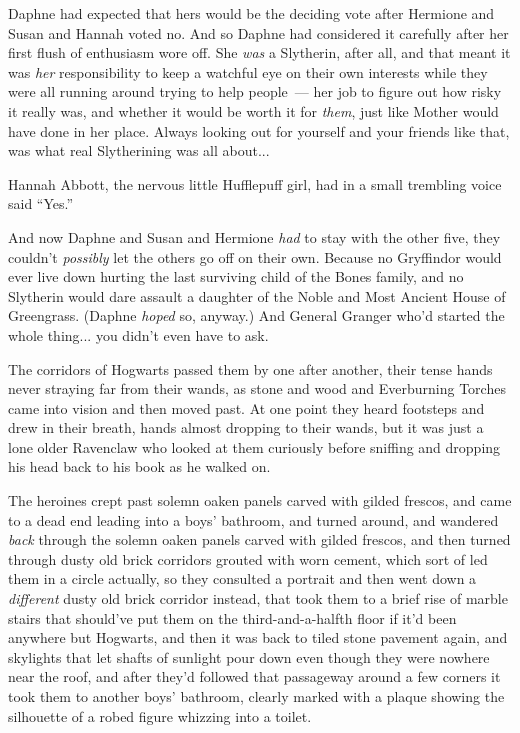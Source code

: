 Daphne had expected that hers would be the deciding vote after Hermione and Susan and Hannah voted no. And so Daphne had considered it carefully after her first flush of enthusiasm wore off. She \emph{was} a Slytherin, after all, and that meant it was \emph{her} responsibility to keep a watchful eye on their own interests while they were all running around trying to help people~--- her job to figure out how risky it really was, and whether it would be worth it for \emph{them}, just like Mother would have done in her place. Always looking out for yourself and your friends like that, was what real Slytherining was all about...

Hannah Abbott, the nervous little Hufflepuff girl, had in a small trembling voice said ``Yes.''

And now Daphne and Susan and Hermione \emph{had} to stay with the other five, they couldn't \emph{possibly} let the others go off on their own. Because no Gryffindor would ever live down hurting the last surviving child of the Bones family, and no Slytherin would dare assault a daughter of the Noble and Most Ancient House of Greengrass. (Daphne \emph{hoped} so, anyway.) And General Granger who'd started the whole thing... you didn't even have to ask.

The corridors of Hogwarts passed them by one after another, their tense hands never straying far from their wands, as stone and wood and Everburning Torches came into vision and then moved past. At one point they heard footsteps and drew in their breath, hands almost dropping to their wands, but it was just a lone older Ravenclaw who looked at them curiously before sniffing and dropping his head back to his book as he walked on.

The heroines crept past solemn oaken panels carved with gilded frescos, and came to a dead end leading into a boys' bathroom, and turned around, and wandered \emph{back} through the solemn oaken panels carved with gilded frescos, and then turned through dusty old brick corridors grouted with worn cement, which sort of led them in a circle actually, so they consulted a portrait and then went down a \emph{different} dusty old brick corridor instead, that took them to a brief rise of marble stairs that should've put them on the third-and-a-halfth floor if it'd been anywhere but Hogwarts, and then it was back to tiled stone pavement again, and skylights that let shafts of sunlight pour down even though they were nowhere near the roof, and after they'd followed that passageway around a few corners it took them to another boys' bathroom, clearly marked with a plaque showing the silhouette of a robed figure whizzing into a toilet.

